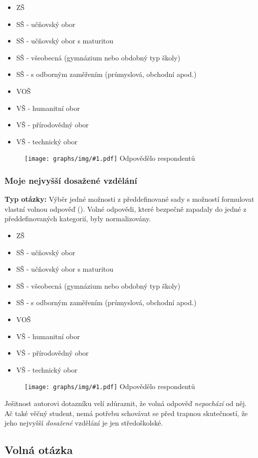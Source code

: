 \documentclass[12pt, a4paper, twoside]{article}
\newcommand{\answercount}[1]{Odpovědělo  respondentů}
\newcommand{\includegraph}[2]{
  \begin{figure}[H]
    \centering
    \textbf{#2}
    \texttt{[image: graphs/img/\#1.pdf]}
    \answercount{#1}
  \end{figure}
}
\newcommand{\qtype}{\textbf{Typ otázky:}
}
\newcommand{\pickOne}{Výběr jedné možnosti z předdefinované sady\xspace}
\newcommand{\withOther}{s možností formulovat vlastní volnou odpověď (\uv{Jiné})\xspace}
\begin{document}
\begin{itemize}
\item ZŠ
\item SŠ - učňovský obor
\item SŠ - učňovský obor s maturitou
\item SŠ - všeobecná (gymnázium nebo obdobný typ školy)
\item SŠ - s odborným zaměřením (průmyslová, obchodní apod.)
\item VOŠ
\item VŠ - humanitní obor
\item VŠ - přírodovědný obor
\item VŠ - technický obor
\end{itemize}

\includegraph{studuji_co}{}

\subsubsection{Moje nejvyšší dosažené vzdělání}

\qtype \pickOne \withOther.
Volné odpovědi, které bezpečně zapadaly do jedné z předdefinovaných
kategorií, byly normalizovány.

\begin{itemize}
\item ZŠ
\item SŠ - učňovský obor
\item SŠ - učňovský obor s maturitou
\item SŠ - všeobecná (gymnázium nebo obdobný typ školy)
\item SŠ - s odborným zaměřením (průmyslová, obchodní apod.)
\item VOŠ
\item VŠ - humanitní obor
\item VŠ - přírodovědný obor
\item VŠ - technický obor
\end{itemize}

\includegraph{moje_nejvyssi_dosazene_vzdelani}{}

{\footnotesize
Ješitnost autorovi dotazníku velí zdůraznit, že volná
odpověď  \emph{nepochází} od něj.
Ač také věčný student, nemá potřebu schovávat se před
trapnou skutečností, že jeho nejvyšší \emph{dosažené} vzdělání
je jen středoškolské.
}

\subsection{Volná otázka }
\end{document}
